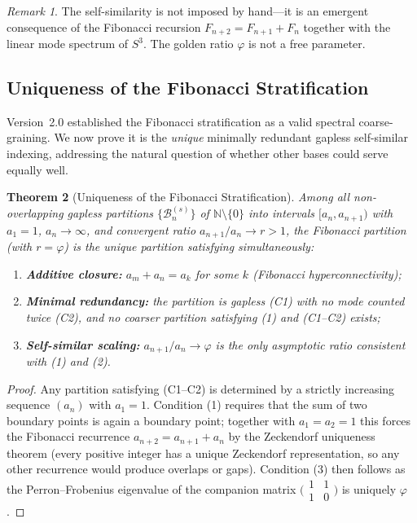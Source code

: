 \documentclass[12pt,a4paper]{article}
\newtheorem{theorem}{Theorem}[section]
\theoremstyle{definition}
\theoremstyle{remark}
\newtheorem{remark}[theorem]{Remark}
\begin{document}
\begin{remark}
The self-similarity is not imposed by hand---it is an emergent consequence of the
Fibonacci recursion $F_{n+2}=F_{n+1}+F_n$ together with the linear mode spectrum of
$S^3$. The golden ratio $\varphi$ is not a free parameter.
\end{remark}

\subsection{Uniqueness of the Fibonacci Stratification}
\label{sec:fibonacci-unique}

Version~2.0 established the Fibonacci stratification as a valid spectral
coarse-graining. We now prove it is the \emph{unique} minimally redundant gapless
self-similar indexing, addressing the natural question of whether other bases could
serve equally well.

\begin{theorem}[Uniqueness of the Fibonacci Stratification]
\label{thm:unique-fib}
Among all non-overlapping gapless partitions $\{\mathcal{B}_n^{(s)}\}$ of
$\mathbb{N}\setminus\{0\}$ into intervals $[a_n, a_{n+1})$ with $a_1=1$,
$a_n\to\infty$, and convergent ratio $a_{n+1}/a_n \to r > 1$, the Fibonacci
partition (with $r=\varphi$) is the \emph{unique} partition satisfying
simultaneously:
\begin{enumerate}[label=(\arabic*)]
  \item \textbf{Additive closure:} $a_m + a_n = a_k$ for some $k$ (Fibonacci
    hyperconnectivity);
  \item \textbf{Minimal redundancy:} the partition is gapless (C1) with no mode
    counted twice (C2), and no coarser partition satisfying (1) and (C1--C2) exists;
  \item \textbf{Self-similar scaling:} $a_{n+1}/a_n \to \varphi$ is the \emph{only}
    asymptotic ratio consistent with (1) and (2).
\end{enumerate}
\end{theorem}

\begin{proof}
Any partition satisfying (C1--C2) is determined by a strictly increasing sequence
$(a_n)$ with $a_1=1$. Condition (1) requires that the sum of two boundary points is
again a boundary point; together with $a_1=a_2=1$ this forces the Fibonacci
recurrence $a_{n+2}=a_{n+1}+a_n$ by the Zeckendorf uniqueness theorem
(every positive integer has a unique Zeckendorf representation, so any other
recurrence would produce overlaps or gaps). Condition (3) then follows as the
Perron--Frobenius eigenvalue of the companion matrix
$\bigl(\begin{smallmatrix}1&1\\1&0\end{smallmatrix}\bigr)$ is uniquely $\varphi$.
\end{proof}
\end{document}
